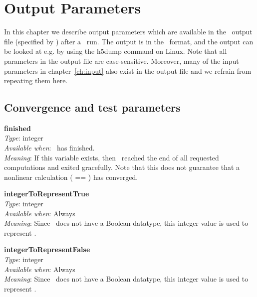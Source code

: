 \chapter{Output Parameters}
\label{ch:output}

\newcommand{\outputparam}[4]{{\setlength{\parindent}{0cm} {\ttfamily \bfseries \hypertarget{#1}{#1}}\\{\it Type}: #2\\{\it Available when}: #3\\{\it Meaning}: #4}}
\newcommand{\outputparamWithUnderscore}[5]{{\setlength{\parindent}{0cm} {\ttfamily \bfseries \hypertarget{#2}{#1}}\\{\it Type}: #3\\{\it Available when}: #4\\{\it Meaning}: #5}}

In this chapter we describe output parameters which are available in the \sfincs~output file (specified by ) after a %
\sfincs~run. 
The output is in the \HDF~format, and the output can be looked at e.g. by using the {\ttfamily h5dump} command on Linux. 
Note that all parameters in the output file are case-sensitive. 
Moreover, many of the input parameters in chapter~\ref{ch:input} also exist in the output file and we refrain from repeating them here. 


\section{Convergence and test parameters}
\label{sec:ConvergenceAndTestParameters}

\myhrule

\outputparam{finished}
{integer}
{\sfincs~has finished.}
{If this variable exists, then \sfincs~reached the end of all requested computations and exited gracefully. 
Note that this does not guarantee that a nonlinear calculation (\parlink{includePhi1} == \true) has converged.}

\myhrule

\outputparam{integerToRepresentTrue}
{integer}
{Always}
{Since \HDF~does not have a Boolean datatype, this integer value is used to represent \true.}

\myhrule

\outputparam{integerToRepresentFalse}
{integer}
{Always}
{Since \HDF~does not have a Boolean datatype, this integer value is used to represent \false.}

